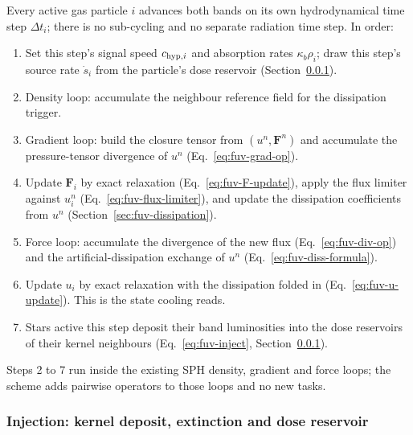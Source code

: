 Every active gas particle $i$ advances both bands on its own
hydrodynamical time step $\Delta t_i$; there is no sub-cycling and no
separate radiation time step. In order:
\begin{enumerate}
  \item Set this step's signal speed $c_{{\rm hyp},i}$ and absorption
    rates $\kappa_{b}\rho_i$; draw this step's source rate $\dot s_i$
    from the particle's dose reservoir (Section~\ref{sec:fuv-injection}).
  \item Density loop: accumulate the neighbour reference field for the
    dissipation trigger.
  \item Gradient loop: build the closure tensor from $(u^n,\mathbf F^n)$
    and accumulate the pressure-tensor divergence of $u^n$
    (Eq.~\ref{eq:fuv-grad-op}).
  \item Update $\mathbf F_i$ by exact relaxation
    (Eq.~\ref{eq:fuv-F-update}), apply the flux limiter against $u_i^n$
    (Eq.~\ref{eq:fuv-flux-limiter}), and update the dissipation
    coefficients from $u^n$ (Section~\ref{sec:fuv-dissipation}).
  \item Force loop: accumulate the divergence of the new flux
    (Eq.~\ref{eq:fuv-div-op}) and the artificial-dissipation exchange of
    $u^n$ (Eq.~\ref{eq:fuv-diss-formula}).
  \item Update $u_i$ by exact relaxation with the dissipation folded in
    (Eq.~\ref{eq:fuv-u-update}). This is the state cooling reads.
  \item Stars active this step deposit their band luminosities into
    the dose reservoirs of their kernel neighbours
    (Eq.~\ref{eq:fuv-inject}, Section~\ref{sec:fuv-injection}).
\end{enumerate}
Steps 2 to 7 run inside the existing SPH density, gradient and force
loops; the scheme adds pairwise operators to those loops and no new
tasks.

\subsubsection{Injection: kernel deposit, extinction and dose reservoir}
\label{sec:fuv-injection}

